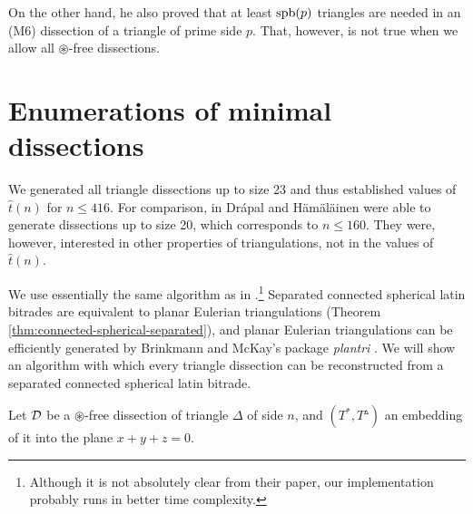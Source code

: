 On the other hand, he also proved that at least $\mathop{\mathrm{spb}}(p)$ triangles are needed in an (M6) dissection of a triangle of prime side $p$. That, however, is not true when we allow all $\circledast$-free dissections.


\section{Enumerations of minimal dissections}

We generated all triangle dissections up to size 23 and thus established values of $\hat t(n)$ for $n \leq 416$. For comparison, in \cite{DrapalHamalainen10} Drápal and Hämäläinen were able to generate dissections up to size 20, which corresponds to $n \leq 160$. They were, however, interested in other properties of triangulations, not in the values of $\hat t(n)$.

We use essentially the same algorithm as in \cite{DrapalHamalainen10}.\footnote{Although it is not absolutely clear from their paper, our implementation probably runs in better time complexity.} Separated connected spherical latin bitrades are equivalent to planar Eulerian triangulations (Theorem \ref{thm:connected-spherical-separated}), and planar Eulerian triangulations can be efficiently generated by Brinkmann and McKay's package \emph{plantri} \cite{BrinkmannMcKay99}. We will show an algorithm with which every triangle dissection can be reconstructed from a separated connected spherical latin bitrade.

\bigskip

Let $\mathcal D$ be a $\circledast$-free dissection of triangle $\Delta$ of side $n$, and $(T^*, T^\vartriangle)$ an embedding of it into the plane $x+y+z=0$.

